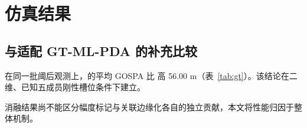 \section{仿真结果}
\subsection{与适配 GT-ML-PDA 的补充比较}
在同一批阈后观测上，\gtmethod 的平均 GOSPA 比 \method 高 56.00 m（表~\ref{tab:gt}）。该结论在二维、已知五成员刚性槽位条件下建立。

消融结果尚不能区分幅度标记与关联边缘化各自的独立贡献，本文将性能归因于整体机制。
